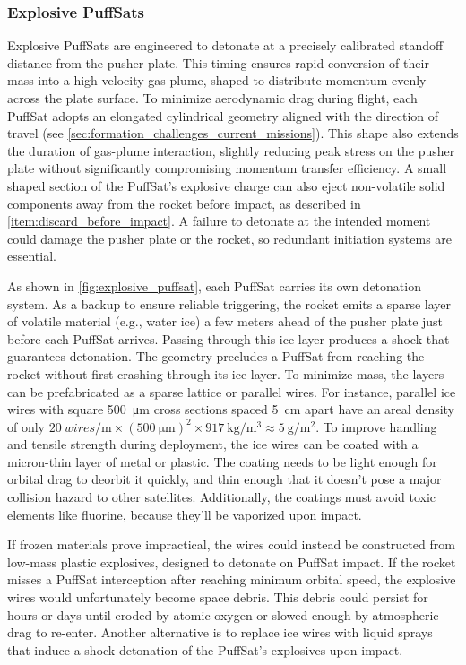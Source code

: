 \documentclass{article}
\begin{document}
\subsubsection{Explosive PuffSats} \label{sec:explosive_puffsat}
Explosive PuffSats are engineered to detonate at a precisely calibrated standoff distance from the pusher plate. This timing ensures rapid conversion of their mass into a high-velocity gas plume, shaped to distribute momentum evenly across the plate surface.  To minimize aerodynamic drag during flight, each PuffSat adopts an elongated cylindrical geometry aligned with the direction of travel (see \autoref{sec:formation_challenges_current_missions}). This shape also extends the duration of gas-plume interaction, slightly reducing peak stress on the pusher plate without significantly compromising momentum transfer efficiency. A small shaped section of the PuffSat's explosive charge can also eject non-volatile solid components away from the rocket before impact, as described in \autoref{item:discard_before_impact}.  A failure to detonate at the intended moment could damage the pusher plate or the rocket, so redundant initiation systems are essential.

As shown in \autoref{fig:explosive_puffsat}, each PuffSat carries its own detonation system. As a backup to ensure reliable triggering, the rocket emits a sparse layer of volatile material (e.g., water ice) a few meters ahead of the pusher plate just before each PuffSat arrives. Passing through this ice layer produces a shock that guarantees detonation. The geometry precludes a  PuffSat from reaching the rocket without first crashing through its ice layer. To minimize mass, the layers can be prefabricated as a sparse lattice or parallel wires. For instance, parallel ice wires with square \SI{500}{\micro\meter} cross sections  spaced \SI{5}{\centi\meter} apart have an areal density of only $\SI{20}{wires\per\meter} \times (\SI{500}{\micro\meter})^2 \times \SI{917}{\kilo\gram\per\cubic\meter} \approx \SI{5}{\gram\per\square\meter}$.  To improve handling and tensile strength during deployment, the ice wires can be coated with a micron-thin layer of metal or plastic. The coating needs to be light enough for orbital drag to deorbit it quickly, and thin enough that it doesn't pose a major collision hazard to other satellites. Additionally, the coatings must avoid toxic elements like fluorine, because they'll be vaporized upon impact.

If frozen materials prove impractical, the wires could instead be constructed from low-mass plastic explosives, designed to detonate on PuffSat impact.  If the rocket misses a PuffSat interception after reaching  minimum orbital speed, the explosive wires would unfortunately become space debris. This debris could  persist for hours or days until eroded by atomic oxygen or slowed enough by atmospheric drag to re-enter. Another alternative is to replace ice wires with liquid sprays that induce a shock detonation of the PuffSat’s explosives upon impact.
\end{document}
